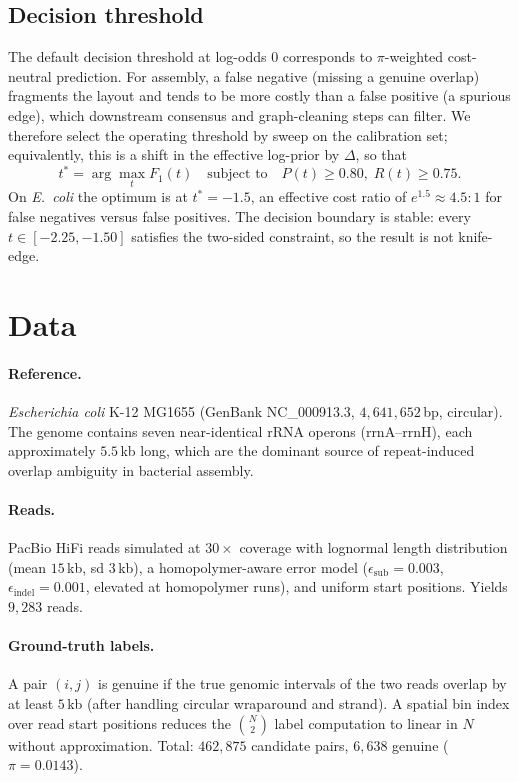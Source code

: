 \documentclass[11pt]{article}
\begin{document}
\subsection{Decision threshold}
\label{sec:threshold}

The default decision threshold at log-odds $0$ corresponds to
$\pi$-weighted cost-neutral prediction. For assembly, a false negative
(missing a genuine overlap) fragments the layout and tends to be more
costly than a false positive (a spurious edge), which downstream consensus
and graph-cleaning steps can filter. We therefore select the operating
threshold by sweep on the calibration set; equivalently, this is a shift
in the effective log-prior by $\Delta$, so that
\begin{equation}
    t^* = \arg\max_t F_1\left(t\right) \quad \text{subject to} \quad P(t) \ge 0.80,\;R(t) \ge 0.75.
\end{equation}
On \textit{E.\ coli} the optimum is at $t^* = -1.5$, an effective cost
ratio of $e^{1.5} \approx 4.5 : 1$ for false negatives versus false
positives. The decision boundary is stable: every $t \in [-2.25, -1.50]$
satisfies the two-sided constraint, so the result is not knife-edge.

\section{Data}
\label{sec:data}

\paragraph{Reference.} \textit{Escherichia coli} K-12 MG1655 (GenBank
NC\_000913.3, $4{,}641{,}652$\,bp, circular). The genome contains seven
near-identical rRNA operons (rrnA--rrnH), each approximately $5.5$\,kb long,
which are the dominant source of repeat-induced overlap ambiguity in
bacterial assembly.

\paragraph{Reads.} PacBio HiFi reads simulated at $30\times$ coverage with
lognormal length distribution (mean $15$\,kb, sd $3$\,kb), a homopolymer-aware
error model ($\epsilon_{\text{sub}} = 0.003$, $\epsilon_{\text{indel}} =
0.001$, elevated at homopolymer runs), and uniform start positions. Yields
$9{,}283$ reads.

\paragraph{Ground-truth labels.} A pair $(i, j)$ is genuine if the true
genomic intervals of the two reads overlap by at least $5$\,kb (after
handling circular wraparound and strand). A spatial bin index over read
start positions reduces the $\binom{N}{2}$ label computation to linear in
$N$ without approximation. Total: $462{,}875$ candidate pairs, $6{,}638$
genuine ($\pi = 0.0143$).
\end{document}
